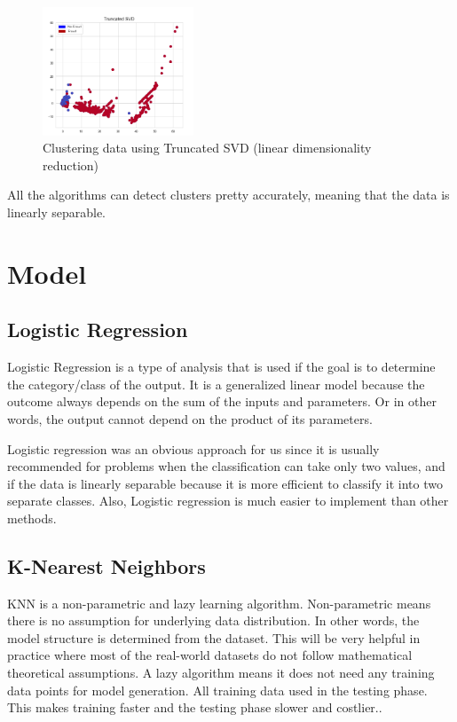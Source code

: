 \documentclass[conference]{IEEEtran}
\begin{document}
\begin{figure}[H]
        \centering\includegraphics[width=0.4\textwidth]{images/clustering_svd.png}
    \caption{Clustering data using Truncated SVD (linear dimensionality reduction)}
    \label{fig:example}
\end{figure}

All the algorithms can detect clusters pretty accurately, meaning that the data is linearly separable.

\section{Model}

\subsection{Logistic Regression}
Logistic Regression is a type of analysis that is used if the goal is to determine the category/class of the output. It is a generalized linear model because the outcome always depends on the sum of the inputs and parameters. Or in other words, the output cannot depend on the product of its parameters.\cite{raschka}

Logistic regression was an obvious approach for us since it is usually recommended for problems when the classification can take only two values, and if the data is linearly separable because it is more efficient to classify it into two separate classes. Also, Logistic regression is much easier to implement than other methods. \cite{log_reg_def}

\subsection{K-Nearest Neighbors}

KNN is a non-parametric and lazy learning algorithm. Non-parametric means there is no assumption for underlying data distribution. In other words, the model structure is determined from the dataset. This will be very helpful in practice where most of the real-world datasets do not follow mathematical theoretical assumptions. A lazy algorithm means it does not need any training data points for model generation. All training data used in the testing phase. This makes training faster and the testing phase slower and costlier.\cite{knn_def}.
\end{document}
